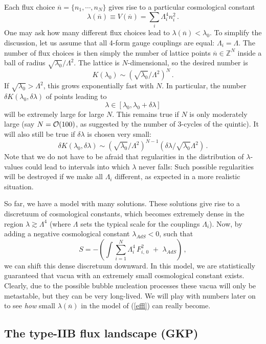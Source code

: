 \documentclass[12pt]{article}
\newcommand{\be}{\begin{equation}}
\newcommand{\ee}{\end{equation}}
\newcommand{\ol}{\overline}
\numberwithin{equation}{section}
\begin{document}
Each flux choice $\ol{n}=\{n_1,\cdots,n_N\}$ gives rise to a particular cosmological constant 
\be
\lambda(\ol{n})\equiv V(\ol{n})=\sum_i \Lambda_i^4 n_i^2\,.
\ee
One may ask how many different flux choices lead to $\lambda(\ol{n})<\lambda_0$. To simplify the discussion, let us assume that all 4-form gauge couplings are equal: $\Lambda_i=\Lambda$. The number of flux choices is then simply the number of lattice points $\ol{n}\in\mathbb{Z}^N$ inside a ball of radius $\sqrt{\lambda_0}/\Lambda^2$. The lattice is $N$-dimensional, so the desired number is 
\be
K(\lambda_0)\sim (\sqrt{\lambda_0}/\Lambda^2)^N\,.
\ee
If $\sqrt{\lambda_0}>\Lambda^2$, this grows exponentially fast with $N$. In particular, the number $\delta K(\lambda_0,\delta\lambda)$ of points leading to
\be
\lambda\in [\lambda_0,\lambda_0+\delta\lambda]
\ee
will be extremely large for large $N$. This remains true if $N$ is only moderately large (say $N={\cal O}(100)$, as suggested by the number of 3-cycles of the quintic). It will also still be true if $\delta\lambda$ is chosen very small:
\be
\delta K(\lambda_0,\delta\lambda)\sim (\sqrt{\lambda_0}/\Lambda^2)^{N-1}(\delta\lambda/\sqrt{\lambda_0}\Lambda^2)\,.
\ee
Note that we do not have to be afraid that regularities in the distribution of $\lambda$-values could lead to intervals into which $\lambda$ never falls: Such possible regularities will be destroyed if we make all $\Lambda_i$ different, as expected in a more realistic situation. 

So far, we have a model with many solutions. These solutions give rise to a discretuum of cosmological constants, which becomes extremely dense in the region $\lambda\gtrsim \Lambda^4$ (where $\Lambda$ sets the typical scale for the couplings $\Lambda_i$). Now, by adding a negative cosmological constant
$\lambda_{AdS}<0$, such that
\be
S= -\left(\int \sum_{i=1}^N\Lambda_i^4\, F_{i,\,0}^2\,\,+\,\,\lambda_{AdS}\right) \,, \label{effl}
\ee
we can shift this dense discretuum downward. In this model, we are statistically guaranteed that vacua with an extremely small cosmological constant exists. Clearly, due to the possible bubble nucleation processes these
vacua will only be metastable, but they can be very long-lived. We will play with numbers later on to see {\it how} small $\lambda(\ol{n})$ in the model of (\ref{effl}) can really become.







\subsection{The type-IIB flux landscape (GKP)}
\end{document}
